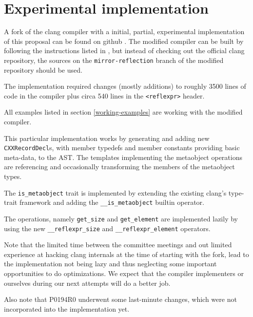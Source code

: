 \section{Experimental implementation}

A fork of the clang compiler with a initial, partial, experimental implementation
of this proposal can be found on github \cite{ReflexprImplementation}.
The modified compiler can be built by following the instructions listed
in \cite{ClangGettingStarted}, but instead of checking out the official clang
repository, the sources on the \texttt{mirror-reflection} branch of the modified
repository should be used.

The implementation required changes (mostly additions) to roughly 3500 lines
of code in the compiler plus circa 540 lines in the \texttt{<reflexpr>} header.

All examples listed in section \ref{working-examples} are working with
the modified compiler.

This particular implementation works by generating and adding new \texttt{CXXRecordDecl}s,
with member typedefs and member constants providing basic meta-data, to the AST.
The templates implementing the metaobject operations are referencing and
occasionally transforming the members of the metaobject types.

The \texttt{is\_metaobject} trait is implemented by extending the existing
clang's type-trait framework and adding the \texttt{\_\_is\_metaobject} builtin
operator.

The  operations, namely \texttt{get\_size} and
\texttt{get\_element} are implemented lazily by using the new
\texttt{\_\_reflexpr\_size} and \texttt{\_\_reflexpr\_element} operators.

Note that the limited time between the committee meetings and out limited experience
at hacking clang internals at the time of starting with the fork,
lead to the implementation not being lazy and thus neglecting some important
opportunities to do optimizations. We expect that the compiler implementers
or ourselves during our next attempts will do a better job.

Also note that P0194R0 underwent some last-minute changes,
which were not incorporated into the implementation yet.
